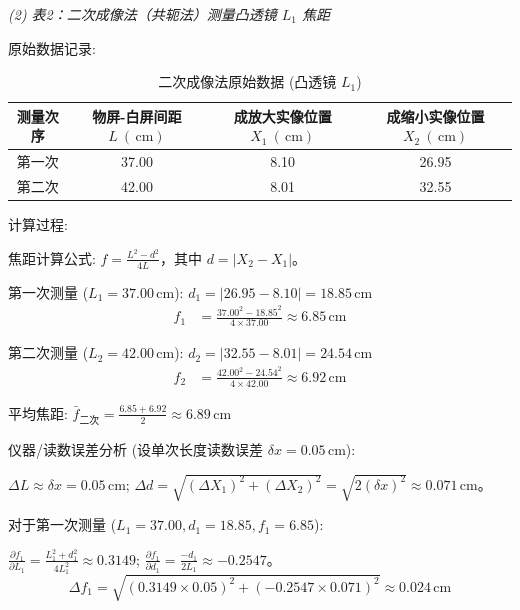 ﻿\documentclass[12pt,a4paper]{article}
\newcommand{\rmcm}{\mathrm{\,cm}}
\begin{document}
\noindent\textit{(2) 表2：二次成像法（共轭法）测量凸透镜 $L_1$ 焦距}
\par\noindent 原始数据记录:
\begin{table}[H]
    \centering
    \caption{二次成像法原始数据 (凸透镜 $L_1$)}
    \begin{tabular}{cccc}
        \toprule[1.5pt]
        测量次序 & 物屏-白屏间距$L~(\rmcm)$ & 成放大实像位置$X_1~(\rmcm)$ & 成缩小实像位置$X_2~(\rmcm)$ \\
        \midrule
        第一次 & 37.00 & 8.10 & 26.95 \\
        第二次 & 42.00 & 8.01 & 32.55 \\
        \bottomrule[1.5pt]
    \end{tabular}
    \label{tab:convex_secondary_raw_refined}
\end{table}
\par\noindent 计算过程:
\par 焦距计算公式: $f = \frac{L^2 - d^2}{4L}$，其中 $d = |X_2 - X_1|$。
\par 第一次测量 ($L_1 = 37.00 \rmcm$): $d_1 = |26.95 - 8.10| = 18.85 \rmcm$
\begin{equation*}
\begin{split}
f_1 &= \frac{37.00^2 - 18.85^2}{4 \times 37.00} \approx 6.85 \rmcm
\end{split}
\end{equation*}
\par 第二次测量 ($L_2 = 42.00 \rmcm$): $d_2 = |32.55 - 8.01| = 24.54 \rmcm$
\begin{equation*}
\begin{split}
f_2 &= \frac{42.00^2 - 24.54^2}{4 \times 42.00} \approx 6.92 \rmcm
\end{split}
\end{equation*}
\par 平均焦距: $\bar{f}_{\text{二次}} = \frac{6.85+6.92}{2} \approx 6.89 \rmcm$
\par\noindent 仪器/读数误差分析 (设单次长度读数误差 $\delta x = 0.05 \rmcm$):
\par $\Delta L \approx \delta x = 0.05 \rmcm$; $\Delta d = \sqrt{(\Delta X_1)^2 + (\Delta X_2)^2} = \sqrt{2(\delta x)^2} \approx 0.071 \rmcm$。
\par 对于第一次测量 ($L_1=37.00, d_1=18.85, f_1=6.85$):
\par $\frac{\partial f_1}{\partial L_1} = \frac{L_1^2+d_1^2}{4L_1^2} \approx 0.3149$; $\frac{\partial f_1}{\partial d_1} = \frac{-d_1}{2L_1} \approx -0.2547$。
\begin{equation*}
\Delta f_1 = \sqrt{\left(0.3149 \times 0.05\right)^2 + \left(-0.2547 \times 0.071\right)^2} \approx 0.024 \rmcm
\end{equation*}
\end{document}
